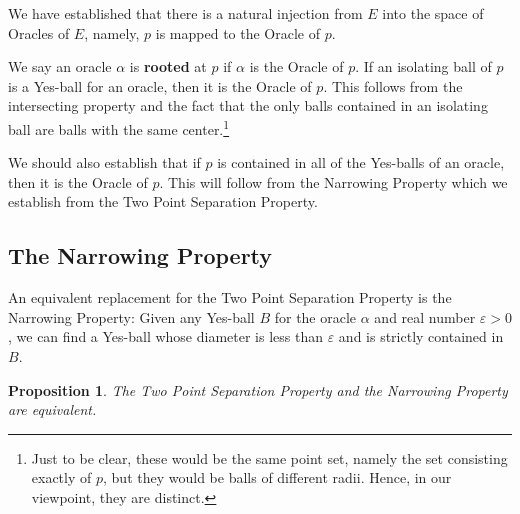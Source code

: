 \documentclass[12pt]{article}
\newtheorem{proposition}{Proposition}[section]
\begin{document}
We have established that there is a natural injection from $E$ into the space of Oracles of $E$, namely, $p$ is mapped to the Oracle of $p$. 

We say an oracle $\alpha$ is \textbf{rooted} at $p$ if $\alpha$ is the Oracle of $p$. If an isolating ball of $p$ is a Yes-ball for an oracle, then it is the Oracle of $p$. This follows from the intersecting property and the fact that the only balls contained in an isolating ball are balls with the same center.\footnote{Just to be clear, these would be the same point set, namely the set consisting exactly of $p$, but they would be balls of different radii. Hence, in our viewpoint, they are distinct.} 

We should also establish that if $p$ is contained in all of the Yes-balls of an oracle, then it is the Oracle of $p$. This will follow from the Narrowing Property which we establish from the Two Point Separation Property. 


\subsection{The Narrowing Property}

An equivalent replacement for the Two Point Separation Property is the Narrowing Property: Given any Yes-ball $B$ for the oracle $\alpha$ and real number $\varepsilon >0$, we can find a Yes-ball whose diameter is less than $\varepsilon$ and is strictly contained in $B$.

\begin{proposition}
    The Two Point Separation Property and the Narrowing Property are equivalent.
\end{proposition}
\end{document}
